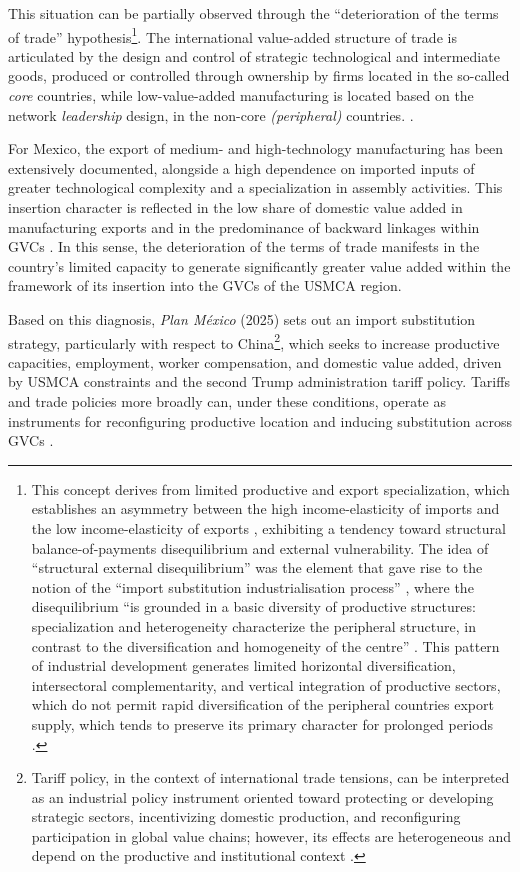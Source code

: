 \documentclass[11pt]{article}
\begin{document}
This situation can be partially observed through the
``deterioration of the terms of trade'' hypothesis\footnote{This concept
derives from limited productive and export specialization, which
establishes an asymmetry between the high income-elasticity of imports
and the low income-elasticity of exports \citep{Prebisch1949}, exhibiting
a tendency toward structural balance-of-payments disequilibrium and
external vulnerability. The idea of ``structural external disequilibrium''
was the element that gave rise to the notion of the ``import substitution
industrialisation process'' \citep{NoyolaVazquez1957,Sunkel1958}, where
the disequilibrium ``is grounded in a basic diversity of productive
structures: specialization and heterogeneity characterize the peripheral
structure, in contrast to the diversification and homogeneity of the
centre'' \citep[p.~57]{Rodriguez2006}. This pattern of industrial
development generates limited horizontal diversification,
intersectoral complementarity, and vertical integration of productive
sectors, which do not permit rapid diversification of the peripheral countries
export supply, which tends to preserve its primary character for
prolonged periods \citep{Barcena2022}.}. The international value-added structure of trade is articulated by the design and control of strategic
technological and intermediate goods, produced or controlled through
ownership by firms located in the so-called \textit{core} countries,
while low-value-added manufacturing is located based on the network
\textit{leadership} design, in the non-core \textit{(peripheral)}
countries. \citep{LimaDuran2013,Garrido2022}.

For Mexico, the export of medium- and high-technology manufacturing has been extensively documented, alongside a high
dependence on imported inputs of greater technological complexity and a
specialization in assembly activities. This insertion character is reflected in the
low share of domestic value added in manufacturing exports and in the
predominance of backward linkages within GVCs
\citep{CastilloDeVries2018,Blyde2014}. In this sense, the deterioration
of the terms of trade manifests in the country's limited capacity to
generate significantly greater value added within the framework of its
insertion into the GVCs of the USMCA region.

Based on this diagnosis, \textit{Plan México} (2025) sets
out an import substitution strategy, particularly with respect to
China\footnote{Tariff policy, in the context of international trade
tensions, can be interpreted as an industrial policy instrument oriented
toward protecting or developing strategic sectors, incentivizing domestic
production, and reconfiguring participation in global value chains;
however, its effects are heterogeneous and depend on the productive and
institutional context \citep{Semieniuk2022,Qiu2019}.}, which seeks to increase productive
capacities, employment, worker compensation, and domestic value added, driven by
USMCA constraints and the second Trump administration tariff policy. Tariffs and trade policies more broadly can, under these conditions, operate as instruments for reconfiguring productive location and inducing substitution across GVCs \citep{Utar2023,Semieniuk2022}.
\end{document}
